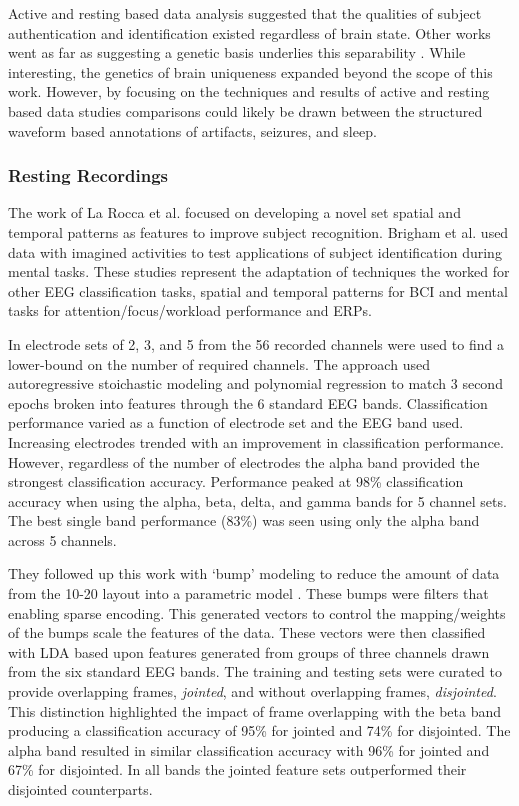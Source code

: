 Active and resting based data analysis suggested that the qualities of subject authentication and identification existed regardless of brain state. Other works went as far as suggesting a genetic basis underlies this separability \cite{Begleiter2006,DeGennaro2008}. While interesting, the genetics of brain uniqueness expanded beyond the scope of this work. However, by focusing on the techniques and results of active and resting based data studies comparisons could likely be drawn between the structured waveform based annotations of artifacts, seizures, and sleep.

\subsubsection{Resting Recordings}

The work of La Rocca et al.\cite{Rocca2012,Rocca2014,Rocca2013} focused on developing a novel set spatial and temporal patterns as features to improve subject recognition. Brigham et al.\cite{Brigham2010} used data with imagined activities to test applications of subject identification during mental tasks. These studies represent the adaptation of techniques the worked for other \ac{EEG} classification tasks, spatial and temporal patterns for \ac{BCI} and mental tasks for attention/focus/workload performance and \acp{ERP}.

In \cite{Rocca2012} electrode sets of 2, 3, and 5 from the 56 recorded channels were used to find a lower-bound on the number of required channels. The approach used autoregressive stoichastic modeling and polynomial regression to match 3 second epochs broken into features through the 6 standard \ac{EEG} bands. Classification performance varied as a function of electrode set and the \ac{EEG} band used. Increasing electrodes trended with an improvement in classification performance. However, regardless of the number of electrodes the alpha band provided the strongest classification accuracy. Performance peaked at 98\% classification accuracy when using the alpha, beta, delta, and gamma bands for 5 channel sets. The best single band performance (83\%) was seen using only the alpha band across 5 channels.

They followed up this work with `bump' modeling to reduce the amount of data from the 10-20 layout into a parametric model \cite{Rocca2013}. These bumps were filters that enabling sparse encoding. This generated vectors  to control the mapping/weights of the bumps scale the features of the data. These vectors were then classified with \ac{LDA} based upon features generated from groups of three channels drawn from the six standard \ac{EEG} bands. The training and testing sets were curated to provide overlapping frames, \emph{jointed}, and without overlapping frames, \emph{disjointed}. This distinction highlighted the impact of frame overlapping with the beta band producing a classification accuracy of 95\% for jointed and 74\% for disjointed. The alpha band resulted in similar classification accuracy with 96\% for jointed and 67\% for disjointed. In all bands the jointed feature sets outperformed their disjointed counterparts.

